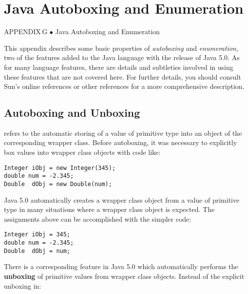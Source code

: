 \setcounter{table}{0}
\setcounter{figure}{0}
\renewcommand{\thetable}{\mbox{G.\arabic{table}}}%
\renewcommand{\thefigure}{\mbox{G--\arabic{figure}}}%

\chapter{Java Autoboxing and Enumeration}

{{\color{cyan}APPENDIX\,G\,\,$\bullet$\,\,}Java Autoboxing and Enumeration}

\noindent This appendix describes some basic properties of {\em autoboxing}
and {\em enumeration}, two of the features added to the Java language
with the release of Java 5.0.  As for many language features, there
are details and subtleties involved in using these features that are
not covered here.  For further details, you should consult Sun's
online references or other references for a more comprehensive
description.

\section*{Autoboxing and Unboxing}
 refers to the automatic storing of a value
of primitive type into an object of the corresponding wrapper class.
Before autoboxing, it was necessary to explicitly box values into wrapper 
class objects with code like:

\begin{jjjlisting}
\begin{lstlisting}
Integer iObj = new Integer(345);
double num = -2.345;
Double  dObj = new Double(num);
\end{lstlisting}
\end{jjjlisting}

\noindent Java 5.0 automatically creates a wrapper class object from a
value of primitive type in many situations where a wrapper class object
is expected.  The assignments above can be accomplished with the simpler code:

\begin{jjjlisting}
\begin{lstlisting}
Integer iObj = 345;
double num = -2.345;
Double  dObj = num;
\end{lstlisting}
\end{jjjlisting}

There is a corresponding feature in Java 5.0 which automatically performs 
the {\bf unboxing} of primitive values from wrapper class objects.
Instead of the explicit unboxing in:

